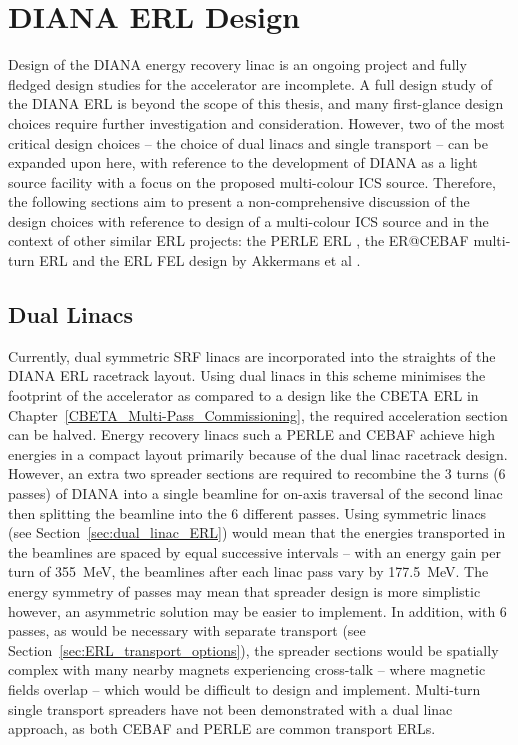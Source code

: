 \documentclass[../main.tex]{subfiles}
\begin{document}
\section{DIANA ERL Design}
\label{sec:DIANA_ERL_design}

Design of the DIANA energy recovery linac is an ongoing project and fully fledged design studies for the accelerator are incomplete. A full design study of the DIANA ERL is beyond the scope of this thesis, and many first-glance design choices require further investigation and consideration. However, two of the most critical design choices -- the choice of dual linacs and single transport -- can be expanded upon here, with reference to the development of DIANA as a light source facility with a focus on the proposed multi-colour ICS source. Therefore, the  following sections aim to present a non-comprehensive discussion of the design choices with reference to design of a multi-colour ICS source and in the context of other similar ERL projects: the PERLE ERL \cite{angal2018perle}, the ER@CEBAF multi-turn ERL \cite{meot2016er} and the ERL FEL design by Akkermans et al \cite{akkermans2017compact}. 

\subsection{Dual Linacs}

Currently, dual symmetric SRF linacs are incorporated into the straights of the DIANA ERL racetrack layout. Using dual linacs in this scheme minimises the footprint of the accelerator as compared to a design like the CBETA ERL in Chapter~\ref{CBETA_Multi-Pass_Commissioning}, the required acceleration section can be halved. Energy recovery linacs such a PERLE \cite{angal2018perle} and CEBAF \cite{meot2016er} achieve high energies in a compact layout primarily because of the dual linac racetrack design. However, an extra two spreader sections are required to recombine the 3 turns (6 passes) of DIANA into a single beamline for on-axis traversal of the second linac then splitting the beamline into the 6 different passes. Using symmetric linacs (see Section~\ref{sec:dual_linac_ERL}) would mean that the energies transported in the beamlines are spaced by equal successive intervals -- with an energy gain per turn of 355~\si{\mega\electronvolt}, the beamlines after each linac pass vary by 177.5~\si{\mega\electronvolt}. The energy symmetry of passes may mean that spreader design is more simplistic however, an asymmetric solution may be easier to implement. In addition, with 6 passes, as would be necessary with separate transport (see Section~\ref{sec:ERL_transport_options}), the spreader sections would be spatially complex with many nearby magnets experiencing cross-talk -- where magnetic fields overlap -- which would be difficult to design and implement. Multi-turn single transport spreaders have not been demonstrated with a dual linac approach, as both CEBAF \cite{meot2016er} and PERLE \cite{angal2018perle} are common transport ERLs. 
\end{document}
